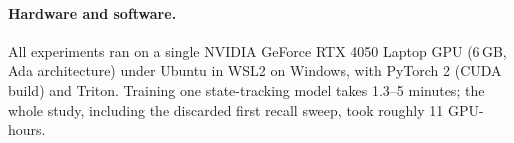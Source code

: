 \paragraph{Hardware and software.} All experiments ran on a single NVIDIA GeForce RTX 4050 Laptop GPU (6\,GB,
Ada architecture) under Ubuntu in WSL2 on Windows, with PyTorch 2 (CUDA build) and Triton. Training one
state-tracking model takes 1.3--5 minutes; the whole study, including the discarded first recall sweep,
took roughly 11 GPU-hours.
